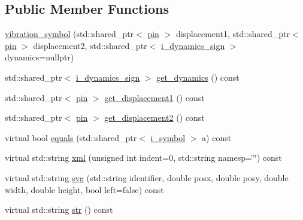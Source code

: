 \subsection*{Public Member Functions}
\begin{DoxyCompactItemize}
\item 
\hyperlink{classmae_1_1fl_1_1laban_1_1mv_1_1vibration__symbol_af069f7c07677083e1f8dbd2ee7d06f54}{vibration\-\_\-symbol} (std\-::shared\-\_\-ptr$<$ \hyperlink{classmae_1_1fl_1_1laban_1_1mv_1_1pin}{pin} $>$ displacement1, std\-::shared\-\_\-ptr$<$ \hyperlink{classmae_1_1fl_1_1laban_1_1mv_1_1pin}{pin} $>$ displacement2, std\-::shared\-\_\-ptr$<$ \hyperlink{classmae_1_1fl_1_1laban_1_1mv_1_1i__dynamics__sign}{i\-\_\-dynamics\-\_\-sign} $>$ dynamics=nullptr)
\item 
std\-::shared\-\_\-ptr$<$ \hyperlink{classmae_1_1fl_1_1laban_1_1mv_1_1i__dynamics__sign}{i\-\_\-dynamics\-\_\-sign} $>$ \hyperlink{classmae_1_1fl_1_1laban_1_1mv_1_1vibration__symbol_a13ff61702dea27ddc05ea7a0939bf21d}{get\-\_\-dynamics} () const 
\item 
std\-::shared\-\_\-ptr$<$ \hyperlink{classmae_1_1fl_1_1laban_1_1mv_1_1pin}{pin} $>$ \hyperlink{classmae_1_1fl_1_1laban_1_1mv_1_1vibration__symbol_a529eccb1557eb44493d26ba2c3ef175a}{get\-\_\-displacement1} () const 
\item 
std\-::shared\-\_\-ptr$<$ \hyperlink{classmae_1_1fl_1_1laban_1_1mv_1_1pin}{pin} $>$ \hyperlink{classmae_1_1fl_1_1laban_1_1mv_1_1vibration__symbol_a44cd2e313eeb28b6101bc9474793a145}{get\-\_\-displacement2} () const 
\item 
virtual bool \hyperlink{classmae_1_1fl_1_1laban_1_1mv_1_1vibration__symbol_a65444ca2f4c0f7845ea3a48375379d65}{equals} (std\-::shared\-\_\-ptr$<$ \hyperlink{classmae_1_1fl_1_1laban_1_1mv_1_1i__symbol}{i\-\_\-symbol} $>$ a) const 
\item 
virtual std\-::string \hyperlink{classmae_1_1fl_1_1laban_1_1mv_1_1vibration__symbol_adaec2bb356fd6321c9585651301e1ac7}{xml} (unsigned int indent=0, std\-::string namesp=\char`\"{}\char`\"{}) const 
\item 
virtual std\-::string \hyperlink{classmae_1_1fl_1_1laban_1_1mv_1_1vibration__symbol_af8f13853392a942ceb8ceb00f3af5e47}{svg} (std\-::string identifier, double posx, double posy, double width, double height, bool left=false) const 
\item 
virtual std\-::string \hyperlink{classmae_1_1fl_1_1laban_1_1mv_1_1vibration__symbol_a6dfa83223bd1d96244268806f6d7f8b5}{str} () const 
\end{DoxyCompactItemize}
